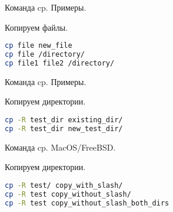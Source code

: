 \begin{frame}[fragile]{Команда cp. Примеры.}
  \begin{block}{Копируем файлы.}
	\begin{lstlisting}[language=bash]
cp file new_file
cp file /directory/
cp file1 file2 /directory/
\end{lstlisting}
  \end{block}
\end{frame}
\begin{frame}[fragile]{Команда cp. Примеры.}
  \begin{block}{Копируем директории.}
	\begin{lstlisting}[language=bash]
cp -R test_dir existing_dir/
cp -R test_dir new_test_dir/
\end{lstlisting}
  \end{block}
\end{frame}
\begin{frame}[fragile]{Команда cp. MacOS/FreeBSD.}
  \begin{block}{Копируем директории.}
	\begin{lstlisting}[language=bash]
cp -R test/ copy_with_slash/
cp -R test copy_without_slash/
cp -R test copy_without_slash_both_dirs
\end{lstlisting}
  \end{block}
\end{frame}
